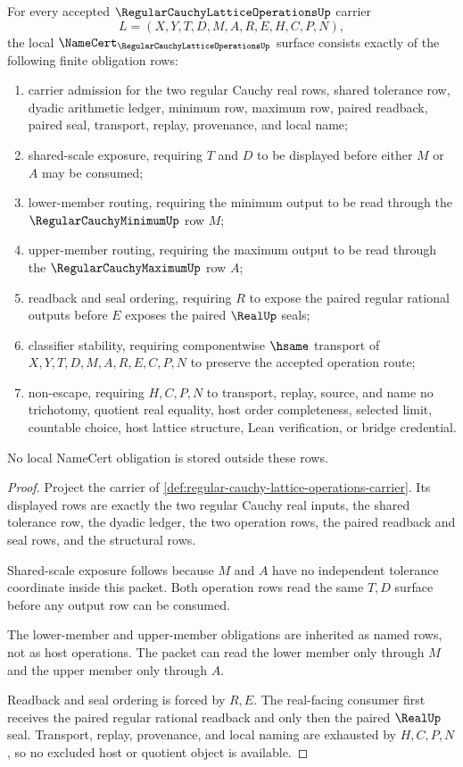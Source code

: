 \begin{theorem}
\label{thm:regular-cauchy-lattice-operations-namecert-obligations}
For every accepted $\RegularCauchyLatticeOperationsUp$ carrier
$$
L=(X,Y,T,D,M,A,R,E,H,C,P,N),
$$
the local $\NameCert_{\RegularCauchyLatticeOperationsUp}$ surface consists exactly of the following finite obligation rows:
\begin{enumerate}
\item carrier admission for the two regular Cauchy real rows, shared tolerance row, dyadic arithmetic ledger, minimum row, maximum row, paired readback, paired seal, transport, replay, provenance, and local name;
\item shared-scale exposure, requiring $T$ and $D$ to be displayed before either $M$ or $A$ may be consumed;
\item lower-member routing, requiring the minimum output to be read through the $\RegularCauchyMinimumUp$ row $M$;
\item upper-member routing, requiring the maximum output to be read through the $\RegularCauchyMaximumUp$ row $A$;
\item readback and seal ordering, requiring $R$ to expose the paired regular rational outputs before $E$ exposes the paired $\RealUp$ seals;
\item classifier stability, requiring componentwise $\hsame$ transport of $X,Y,T,D,M,A,R,E,C,P,N$ to preserve the accepted operation route;
\item non-escape, requiring $H,C,P,N$ to transport, replay, source, and name no trichotomy, quotient real equality, host order completeness, selected limit, countable choice, host lattice structure, Lean verification, or bridge credential.
\end{enumerate}
No local NameCert obligation is stored outside these rows.
\end{theorem}
\begin{proof}
Project the carrier of \autoref{def:regular-cauchy-lattice-operations-carrier}. Its displayed rows are exactly the two regular Cauchy real inputs, the shared tolerance row, the dyadic ledger, the two operation rows, the paired readback and seal rows, and the structural rows.

Shared-scale exposure follows because $M$ and $A$ have no independent tolerance coordinate inside this packet. Both operation rows read the same $T,D$ surface before any output row can be consumed.

The lower-member and upper-member obligations are inherited as named rows, not as host operations. The packet can read the lower member only through $M$ and the upper member only through $A$.

Readback and seal ordering is forced by $R,E$. The real-facing consumer first receives the paired regular rational readback and only then the paired $\RealUp$ seal. Transport, replay, provenance, and local naming are exhausted by $H,C,P,N$, so no excluded host or quotient object is available.
\end{proof}

